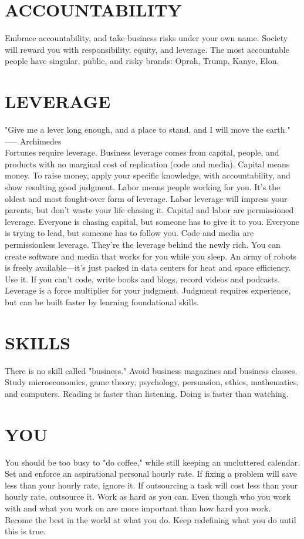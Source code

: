 \documentclass[a4paper,10pt]{article}
\begin{document}
\section{ACCOUNTABILITY}
Embrace accountability, and take business risks under your own name. Society will reward you with responsibility, equity, and leverage. The most accountable people have singular, public, and risky brands: Oprah, Trump, Kanye, Elon.

\section{LEVERAGE}
"Give me a lever long enough, and a place to stand, and I will move the earth." —-- Archimedes \\
Fortunes require leverage. Business leverage comes from capital, people, and products with no marginal cost of replication (code and media). Capital means money. To raise money, apply your specific knowledge, with accountability, and show resulting good judgment. Labor means people working for you. It's the oldest and most fought-over form of leverage. Labor leverage will impress your parents, but don't waste your life chasing it. Capital and labor are permissioned leverage. Everyone is chasing capital, but someone has to give it to you. Everyone is trying to lead, but someone has to follow you. Code and media are permissionless leverage. They're the leverage behind the newly rich. You can create software and media that works for you while you sleep. An army of robots is freely available—it's just packed in data centers for heat and space efficiency. Use it. If you can't code, write books and blogs, record videos and podcasts. Leverage is a force multiplier for your judgment. Judgment requires experience, but can be built faster by learning foundational skills.

\section{SKILLS}
There is no skill called "business." Avoid business magazines and business classes. Study microeconomics, game theory, psychology, persuasion, ethics, mathematics, and computers. Reading is faster than listening. Doing is faster than watching.

\section{YOU}
You should be too busy to "do coffee," while still keeping an uncluttered calendar. Set and enforce an aspirational personal hourly rate. If fixing a problem will save less than your hourly rate, ignore it. If outsourcing a task will cost less than your hourly rate, outsource it. Work as hard as you can. Even though who you work with and what you work on are more important than how hard you work. Become the best in the world at what you do. Keep redefining what you do until this is true.
\end{document}
